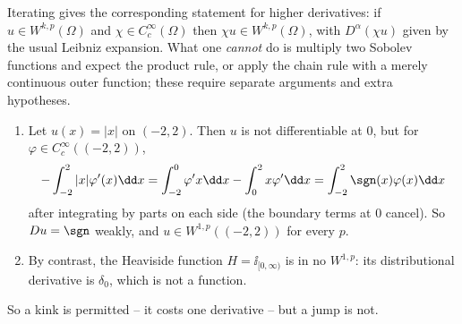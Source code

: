 Iterating gives the corresponding statement for higher derivatives: if $u \in W^{k,p}(\Omega)$ and $\chi\in C_c^\infty(\Omega)$ then $\chi u \in W^{k,p}(\Omega)$, with $D^\alpha(\chi u)$ given by the usual Leibniz expansion. What one \emph{cannot} do is multiply two Sobolev functions and expect the product rule, or apply the chain rule with a merely continuous outer function; these require separate arguments and extra hypotheses.

\begin{example}\label{ex:kink}
	\begin{enumerate}[label=(\roman*)]
		\item Let $u(x)=|x|$ on $(-2,2)$. Then $u$ is not differentiable at $0$, but for $\varphi\in C_c^\infty((-2,2))$,
		$$-\int_{-2}^2|x|\varphi'(x)\dd x = \int_{-2}^0\varphi'x\dd x-\int_0^2 x\varphi'\dd x = \int_{-2}^2\sgn(x)\varphi(x)\dd x$$
		after integrating by parts on each side (the boundary terms at $0$ cancel). So $Du=\sgn$ weakly, and $u \in W^{1,p}((-2,2))$ for every $p$.
		\item By contrast, the Heaviside function $H=\ii_{[0,\infty)}$ is in no $W^{1,p}$: its distributional derivative is $\delta_0$, which is not a function.
	\end{enumerate}
	So a kink is permitted -- it costs one derivative -- but a jump is not.
\begin{center}
\end{center}
\end{example}

